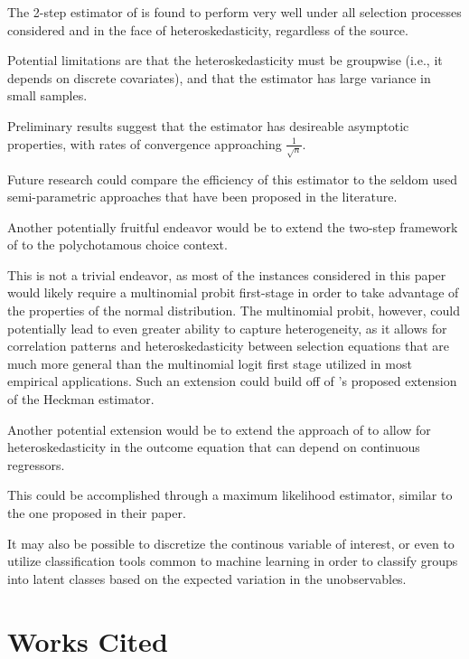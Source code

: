 \documentclass{article}
\begin{document}
The 2-step estimator of \citet{reichert2014} is found to perform very well under all selection processes considered and in the face of heteroskedasticity, regardless of the source.  

Potential limitations are that the heteroskedasticity must be groupwise (i.e., it depends on discrete covariates), and that the estimator has large variance in small samples.  

Preliminary results suggest that the estimator has desireable asymptotic properties, with rates of convergence approaching $\frac{1}{\sqrt{n}}$. 

 Future research could compare the efficiency of this estimator to the seldom used semi-parametric approaches that have been proposed in the literature.

Another potentially fruitful endeavor would be to extend the two-step framework of \citet{reichert2014} to the polychotamous choice context.

  This is not a trivial endeavor, as most of the instances considered in this paper would likely require a multinomial probit first-stage in order to take advantage of the properties of the normal distribution.  The multinomial probit, however, could potentially lead to even greater ability to capture heterogeneity, as it allows for correlation patterns and heteroskedasticity between selection equations that are much more general than the multinomial logit first stage utilized in most empirical applications.  Such an extension could build off of \citet{glewwe1993}'s proposed extension of the Heckman estimator.

Another potential extension would be to extend the approach of \citet{reichert2014} to allow for heteroskedasticity in the outcome equation that can depend on continuous regressors.

This could be accomplished through a maximum likelihood estimator, similar to the one proposed in their paper.  

It may also be possible to discretize the continous variable of interest, or even to utilize classification tools common to machine learning in order to classify groups into latent classes based on the expected variation in the unobservables.

\bigskip
\section{Works Cited}
	


\appendix
\end{document}
